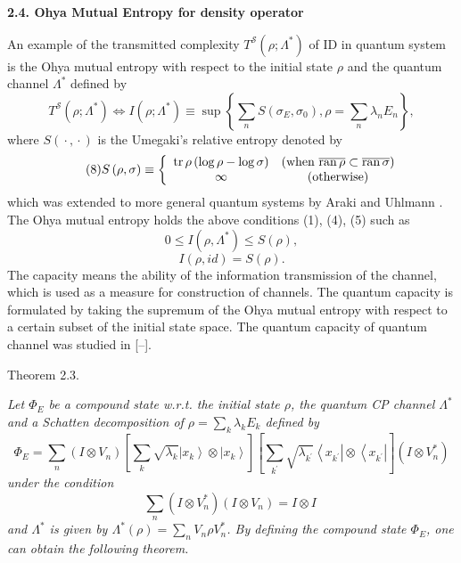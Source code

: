 \smallskip
\textbf{2.4. Ohya Mutual Entropy for density operator}

An example of the transmitted complexity  $  T^{\mathcal{S}}\left( \rho ; \Lambda ^{\ast }\right)  $   of ID in quantum system is the Ohya mutual
entropy with respect to the initial state  $  \rho  $   and the quantum channel  $  %
\Lambda ^{\ast } $   defined by%
\begin{equation}
T^{\mathcal{S}}\left( {\rho ;\Lambda ^{\ast }}\right) \Leftrightarrow
I\left( \rho ;\Lambda ^{\ast }\right) \equiv \sup \left\{ \sum_{n}S(\sigma
_{E},\sigma _{0}),\rho =\sum_{n}\lambda _{n}E_{n}\right\},  \nonumber
\end{equation}%
where  $  S\left( {}\cdot {}, {}\cdot {}\right)  $   is the Umegaki's relative entropy 
\cite{nv:-Ume}  denoted by 
\begin{equation}
\tag{8}
S\left( {\rho, \sigma }\right) \equiv \left\{ 
\begin{array}{cc}
\mathop{\rm tr}\rho \left( \log \rho-\log \sigma \right) & \left( \hbox{when }\overline{%
\mathop{\rm ran}\rho }\subset \overline{\mathop{\rm ran}\sigma }\right)    \\
\infty & \left( \hbox{otherwise}\right)%
\end{array}%
\right.
\end{equation}%
which was extended to more general quantum systems by Araki and Uhlmann \cite{nv:-O3,nv:-OP,nv:-OV, nv:-Ara,nv:-Uhl}. The Ohya mutual entropy holds the above conditions
(1), (4), (5) such as%
\[
0\leq I\left( {\rho, \Lambda ^{\ast }}\right) \leq {S( \rho) }, 
\]%
\[
I\left( {\rho, id}\right) ={S( \rho).} 
\]%
The capacity means the ability of the information transmission of the
channel, which is used as a measure for construction of channels. The
quantum capacity is formulated by taking the supremum of the Ohya mutual
entropy with respect to a certain subset of the initial state space. The
quantum capacity of quantum channel was studied in [--].

{\small\sc Theorem 2.3.} {\it
Let   $\Phi _{E} $  be  a  compound  
state  w.r.t.  the  initial  state $\rho$,   the  quan\-tum  CP
  channel $  \Lambda ^{\ast }$  {and  a%
  Schatten  decomposition  of } $  {\rho
=\sum_{k}\lambda _{k}E_{k}} $  {  defined  by}%
\[
{\Phi _{E}=\sum_{n}\left( I\otimes V_{n}\right) \left[ \sum_{k}\sqrt{\lambda
_{k}}{\left\vert x_{k}\right\rangle }\otimes {\left\vert x_{k}\right\rangle }%
\right] \left[ \sum_{k^{\prime }}\sqrt{\lambda _{k^{\prime }}}{\left\langle
x_{k^{\prime }}\right\vert }\otimes {\left\langle x_{k^{\prime }}\right\vert 
}\right] \left( I\otimes V_{n}^{\ast }\right) }
\]%
under  the  condition   %
\[
{\sum_{n}\left( I\otimes V_{n}^{\ast }\right) \left( I\otimes V_{n}\right)
=I\otimes I\mathrm{\;}}
\]%
and $   \Lambda ^{\ast }$  is  given  by $   %
\Lambda ^{\ast }( \rho) =\sum_{n}V_{n}\rho V_{n}^{\ast } $. By
defining the compound state  $  {\Phi _{E}} $,    one can obtain the following
theorem.

}

